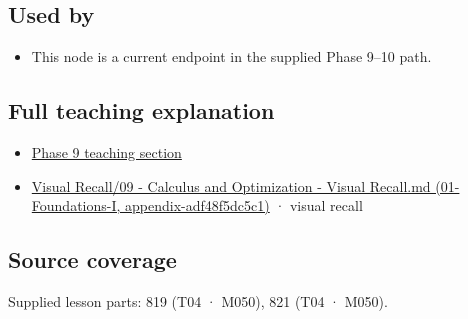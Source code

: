 \subsection{Used by}\label{appendix-e2d476574aab-used-by}

\begin{itemize}
\tightlist
\item
  This node is a current endpoint in the supplied Phase 9--10 path.
\end{itemize}

\subsection{Full teaching explanation}\label{appendix-e2d476574aab-full-teaching-explanation}

\begin{itemize}
\tightlist
\item
  \hyperref[02-foundations-ii-ch021-multivariable-derivatives-and-sensitivity]{Phase 9 teaching section}
\item
  \href{../01-Foundations-I/main.pdf\#nameddest=appendix-adf48f5dc5c1}{Visual Recall/09 - Calculus and Optimization - Visual Recall.md (01-Foundations-I, appendix-adf48f5dc5c1)} · visual recall
\end{itemize}

\subsection{Source coverage}\label{appendix-e2d476574aab-source-coverage}

Supplied lesson parts: 819 (T04 · M050), 821 (T04 · M050).
